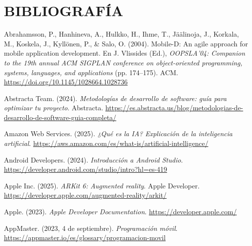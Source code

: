 \chapter*{BIBLIOGRAFÍA}
\label{cap:bibliografia}

\begin{referenciasapa}

\item Abrahamsson, P., Hanhineva, A., Hulkko, H., Ihme, T., Jäälinoja, J., Korkala, M., Koskela, J., Kyllönen, P., \& Salo, O. (2004). Mobile-D: An agile approach for mobile application development. En J. Vlissides (Ed.), \textit{OOPSLA'04: Companion to the 19th annual ACM SIGPLAN conference on object-oriented programming, systems, languages, and applications} (pp. 174--175). ACM. \url{https://doi.org/10.1145/1028664.1028736}

\item Abstracta Team. (2024). \textit{Metodologías de desarrollo de software: guía para optimizar tu proyecto}. Abstracta. \url{https://es.abstracta.us/blog/metodologias-de-desarrollo-de-software-guia-completa/}

\item Amazon Web Services. (2025). \textit{¿Qué es la IA? Explicación de la inteligencia artificial}. \url{https://aws.amazon.com/es/what-is/artificial-intelligence/}

\item Android Developers. (2024). \textit{Introducción a Android Studio}. \url{https://developer.android.com/studio/intro?hl=es-419}

\item Apple Inc. (2025). \textit{ARKit 6: Augmented reality}. Apple Developer. \url{https://developer.apple.com/augmented-reality/arkit/}

\item Apple. (2023). \textit{Apple Developer Documentation}. \url{https://developer.apple.com/}

\item AppMaster. (2023, 4 de septiembre). \textit{Programación móvil}. \url{https://appmaster.io/es/glossary/programacion-movil}


\end{referenciasapa}
